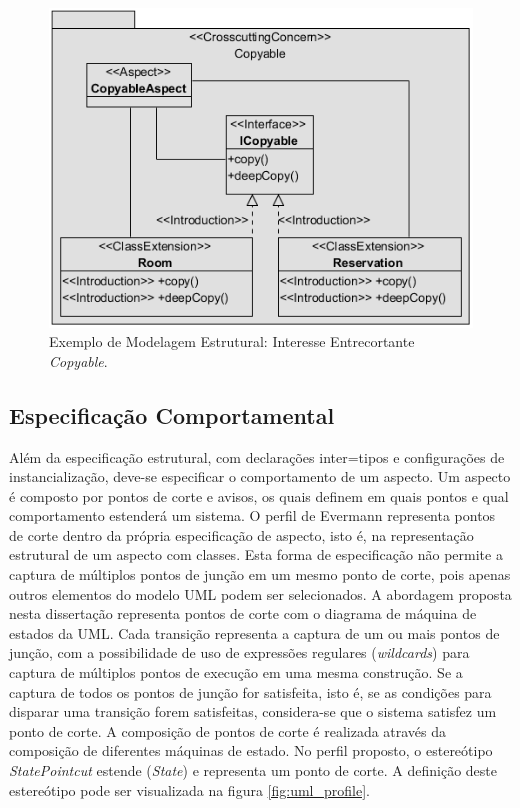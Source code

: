 \begin{figure}[!h] \centering
	\includegraphics{img/structural_profile_example.png}
	\caption{Exemplo de Modelagem Estrutural: Interesse Entrecortante \textit{Copyable}.}\label{fig:structural_profile_example}
\end{figure}

\subsection{Especificação Comportamental}

Além da especificação estrutural, com declarações inter=tipos e configurações de instancialização, deve-se especificar o comportamento de um aspecto.
Um aspecto é composto por pontos de corte e avisos, os quais definem em quais pontos e qual comportamento estenderá um sistema. O perfil de Evermann 
\cite{Evermann:2007:MSP:1229375.1229379} representa pontos de corte dentro da própria especificação de aspecto, isto é, na representação estrutural de
um aspecto com classes. Esta forma de especificação não permite a captura de múltiplos pontos de junção em um mesmo ponto de corte, pois
apenas outros elementos do modelo UML podem ser selecionados. A abordagem proposta nesta dissertação representa pontos de corte com o diagrama de máquina 
de estados da UML. Cada transição representa a captura de um ou mais pontos de junção, com a possibilidade de uso de expressões regulares
(\textit{wildcards}) para captura de múltiplos pontos de execução em uma mesma construção. Se a captura de todos os pontos de junção for 
satisfeita, isto é, se as condições para disparar uma transição forem satisfeitas, considera-se que o sistema satisfez um ponto de corte. A composição
de pontos de corte é realizada através da composição de diferentes máquinas de estado. No perfil proposto, o estereótipo \textit{StatePointcut} 
estende (\textit{State}) e representa um ponto de corte. A definição deste estereótipo pode ser visualizada na figura \ref{fig:uml_profile}.

